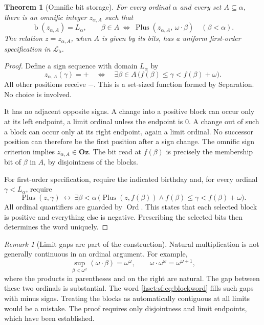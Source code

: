 \documentclass[11pt,letterpaper]{article}
\newtheorem{theorem}{Theorem}[section]
\theoremstyle{definition}
\theoremstyle{remark}
\newtheorem{remark}[remark]{Remark}\aliascntresetthe{remark}
\newcommand{\Ord}{\operatorname{Ord}}
\newcommand{\bd}{\operatorname{b}}
\newcommand{\Oz}{\mathbf{Oz}}
\newcommand{\Plusp}{\operatorname{Plus}}
\newcommand{\Lb}{\mathcal L_{\mathrm b}}
\begin{document}
\begin{theorem}[Omnific bit storage]\label{hset:sf:thm:bitstorage}
For every ordinal $\alpha$ and every set $A\subseteq\alpha$, there is an omnific
integer $z_{\alpha,A}$ such that
\[
 \bd(z_{\alpha,A})=L_\alpha,\qquad
 \beta\in A\ \Longleftrightarrow\ \Plusp(z_{\alpha,A},\,\omega\cdot\beta)\quad(\beta<\alpha).
\]
The relation $z=z_{\alpha,A}$, when $A$ is given by its bits, has a uniform
first-order specification in $\Lb$.
\end{theorem}
\begin{proof}
Define a sign sequence with domain $L_\alpha$ by
\begin{equation}\label{hset:sf:eq:blockword}
 z_{\alpha,A}(\gamma)=+\quad\Longleftrightarrow\quad
 \exists\beta\in A\,\bigl(f(\beta)\le\gamma<f(\beta)+\omega\bigr).
\end{equation}
All other positions receive $-$. This is a set-sized function formed by
Separation. No choice is involved.

It has no adjacent opposite signs. A change into a positive block can occur only
at its left endpoint, a limit ordinal unless the endpoint is $0$. A change out of
such a block can occur only at its right endpoint, again a limit ordinal. No
successor position can therefore be the first position after a sign change. The
omnific sign criterion implies $z_{\alpha,A}\in\Oz$. The bit read at $f(\beta)$ is
precisely the membership bit of $\beta$ in $A$, by disjointness of the blocks.

For first-order specification, require the indicated birthday and, for every
ordinal $\gamma<L_\alpha$, require
\[
 \Plusp(z,\gamma)\ \longleftrightarrow\
 \exists\beta<\alpha\,\bigl(\Plusp(z,f(\beta))\land f(\beta)\le\gamma<f(\beta)+\omega\bigr).
\]
All ordinal quantifiers are guarded by $\Ord$. This states that each selected
block is positive and everything else is negative. Prescribing the selected bits
then determines the word uniquely.
\end{proof}

\begin{remark}[Limit gaps are part of the construction]\label{hset:sf:rem:gaps}
Natural multiplication is not generally continuous in an ordinal argument. For
example,
\[
 \sup_{\beta<\omega^\omega}(\omega\cdot\beta)=\omega^\omega,
 \qquad \omega\cdot\omega^\omega=\omega^{\omega+1},
\]
where the products in parentheses and on the right are natural. The gap between
these two ordinals is substantial. The word \eqref{hset:sf:eq:blockword} fills such gaps
with minus signs. Treating the blocks as automatically contiguous at all limits
would be a mistake. The proof requires only disjointness and limit endpoints,
which have been established.
\end{remark}
\end{document}
